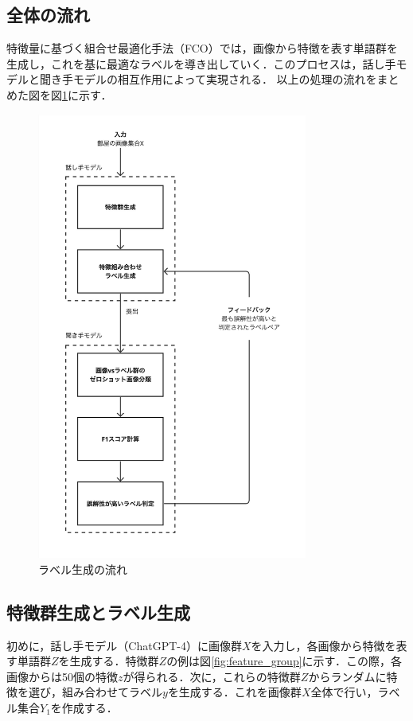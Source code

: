 \documentclass[a4paper,11pt]{jreport}
\begin{document}
\subsection{全体の流れ}
特徴量に基づく組合せ最適化手法（FCO）では，画像から特徴を表す単語群を生成し，これを基に最適なラベルを導き出していく．このプロセスは，話し手モデルと聞き手モデルの相互作用によって実現される．
以上の処理の流れをまとめた図を図\ref{fig:cof_flow_example}に示す．

\begin{figure}[H]
  \centering
  \includegraphics[width=3.5in]{figures/COF_flow.jpg}
  \caption{ラベル生成の流れ}
  \label{fig:cof_flow_example}
\end{figure}

\subsection{特徴群生成とラベル生成}
初めに，話し手モデル（ChatGPT-4）に画像群$X$を入力し，各画像から特徴を表す単語群$Z$を生成する．特徴群$Z$の例は図\ref{fig:feature_group}に示す．この際，各画像からは50個の特徴$z$が得られる．次に，これらの特徴群$Z$からランダムに特徴を選び，組み合わせてラベル$y$を生成する．これを画像群$X$全体で行い，ラベル集合$Y_1$を作成する．
\end{document}
